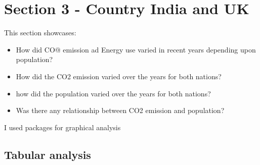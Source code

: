 \documentclass[11pt,a4paper,]{article}
\providecommand{\tightlist}{%
  \setlength{\itemsep}{0pt}\setlength{\parskip}{0pt}}
\begin{document}
\clearpage

\hypertarget{section-3---country-india-and-uk}{%
\section{Section 3 - Country India and UK}\label{section-3---country-india-and-uk}}

This section showcases:

\begin{itemize}
\tightlist
\item
  How did CO@ emission ad Energy use varied in recent years depending upon population?
\item
  How did the CO2 emission varied over the years for both nations?
\item
  how did the population varied over the years for both nations?
\item
  Was there any relationship between CO2 emission and population?
\end{itemize}

I used packages \textcite{ggplot2} for graphical analysis

\hypertarget{tabular-analysis}{%
\subsection{Tabular analysis}\label{tabular-analysis}}
\end{document}
